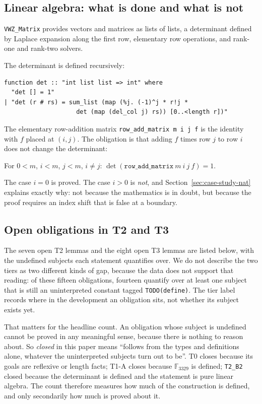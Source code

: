 \subsection{Linear algebra: what is done and what is not}

\texttt{VWZ\_Matrix} provides vectors and matrices as lists of lists, a
determinant defined by Laplace expansion along the first row, elementary row
operations, and rank-one and rank-two solvers.

The determinant is defined recursively:

\begin{lstlisting}
function det :: "int list list => int" where
  "det [] = 1"
| "det (r # rs) = sum_list (map (%j. (-1)^j * r!j *
                    det (map (del_col j) rs)) [0..<length r])"
\end{lstlisting}

The elementary row-addition matrix \texttt{row\_add\_matrix m i j f} is the
identity with $f$ placed at $(i,j)$. The obligation is that adding $f$ times row
$j$ to row $i$ does not change the determinant:

\begin{theorem}
For $0 < m$, $i < m$, $j < m$, $i \neq j$:
$\det(\texttt{row\_add\_matrix}\ m\ i\ j\ f) = 1$.
\end{theorem}

The case $i = 0$ is proved. The case $i > 0$ is \emph{not}, and
Section~\ref{sec:case-study-nat} explains exactly why: not because the
mathematics is in doubt, but because the proof requires an index shift that is
false at a boundary.

\subsection{Open obligations in T2 and T3}

The seven open T2 lemmas and the eight open T3 lemmas are listed below, with
the undefined subjects each statement quantifies over. We do not describe the two
tiers as two different kinds of gap, because the data does not support that
reading: of these fifteen obligations, fourteen quantify over at least one subject
that is still an uninterpreted constant tagged \texttt{TODO(define)}. The tier
label records where in the development an obligation sits, not whether its
subject exists yet.

That matters for the headline count. An obligation whose subject is undefined
cannot be proved in any meaningful sense, because there is nothing to reason
about. So \emph{closed} in this paper means ``follows from the types and
definitions alone, whatever the uninterpreted subjects turn out to be''. T0
closes because its goals are reflexive or length facts; T1-A closes because
$\mathbb{F}_{3329}$ is defined; \texttt{T2\_B2} closed because the determinant is
defined and the statement is pure linear algebra. The count therefore measures
how much of the construction is defined, and only secondarily how much is proved
about it.

